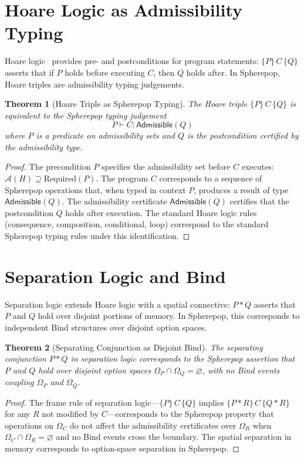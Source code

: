 \documentclass[12pt, a4paper, openany]{book}
\theoremstyle{plain}
\newtheorem{theorem}{Theorem}[chapter]
\theoremstyle{definition}
\theoremstyle{remark}
\newcommand{\calA}{\mathcal{A}}
\newcommand{\Adm}{\mathsf{Admissible}}
\begin{document}
\section{Hoare Logic as Admissibility Typing}

Hoare logic~\cite{hoare85} provides pre- and postconditions for program
statements: $\{P\}\, C\, \{Q\}$ asserts that if $P$ holds before executing
$C$, then $Q$ holds after. In Spherepop, Hoare triples are admissibility typing
judgements.

\begin{theorem}[Hoare Triple as Spherepop Typing]
The Hoare triple $\{P\}\, C\, \{Q\}$ is equivalent to the Spherepop typing
judgement
\[
P \vdash C : \Adm(Q)
\]
where $P$ is a predicate on admissibility sets and $Q$ is the postcondition
certified by the admissibility type.
\end{theorem}

\begin{proof}
The precondition $P$ specifies the admissibility set before $C$ executes:
$\calA(H) \supseteq \mathrm{Required}(P)$. The program $C$ corresponds to a
sequence of Spherepop operations that, when typed in context $P$, produces a
result of type $\Adm(Q)$. The admissibility certificate $\Adm(Q)$ certifies
that the postcondition $Q$ holds after execution. The standard Hoare logic rules
(consequence, composition, conditional, loop) correspond to the standard
Spherepop typing rules under this identification.
\end{proof}

\section{Separation Logic and Bind}

Separation logic extends Hoare logic with a spatial connective: $P * Q$ asserts
that $P$ and $Q$ hold over disjoint portions of memory. In Spherepop, this
corresponds to independent Bind structures over disjoint option spaces.

\begin{theorem}[Separating Conjunction as Disjoint Bind]
The separating conjunction $P * Q$ in separation logic corresponds to the
Spherepop assertion that $P$ and $Q$ hold over disjoint option spaces
$\Omega_P \cap \Omega_Q = \varnothing$, with no Bind events coupling $\Omega_P$
and $\Omega_Q$.
\end{theorem}

\begin{proof}
The frame rule of separation logic---$\{P\}\, C\, \{Q\}$ implies
$\{P * R\}\, C\, \{Q * R\}$ for any $R$ not modified by $C$---corresponds
to the Spherepop property that operations on $\Omega_C$ do not affect the
admissibility certificates over $\Omega_R$ when $\Omega_C \cap \Omega_R = \varnothing$
and no Bind events cross the boundary. The spatial separation in memory
corresponds to option-space separation in Spherepop.
\end{proof}
\end{document}
